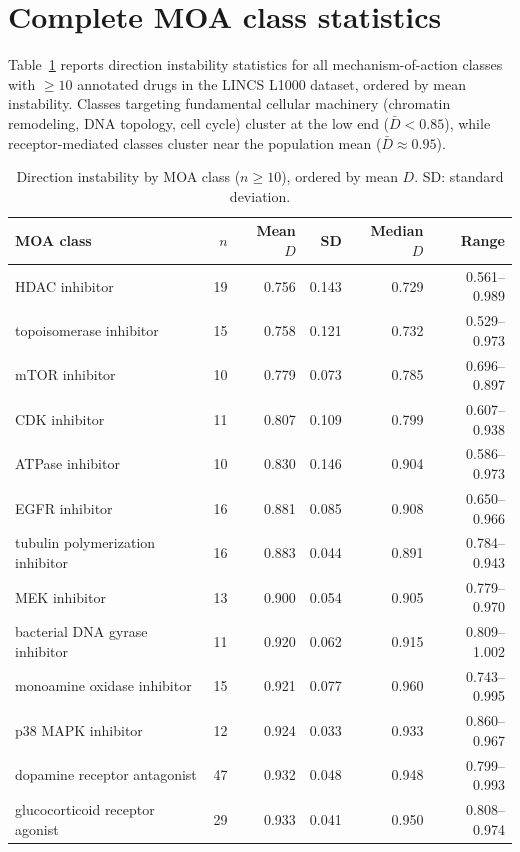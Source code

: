 \documentclass[11pt]{article}
\begin{document}



\appendix
\section{Complete MOA class statistics}
\label{app:moa}

Table~\ref{tab:moa_full} reports direction instability statistics for all
mechanism-of-action classes with $\geq 10$ annotated drugs in the LINCS L1000
dataset, ordered by mean instability. Classes targeting fundamental
cellular machinery (chromatin remodeling, DNA topology, cell cycle) cluster
at the low end ($\bar{D} < 0.85$), while receptor-mediated classes cluster
near the population mean ($\bar{D} \approx 0.95$).

\begin{table}[h]
\centering
\caption{Direction instability by MOA class ($n \geq 10$), ordered by
mean $D$. SD: standard deviation.}
\label{tab:moa_full}
\small
\begin{tabular}{lrrrrr}
\toprule
MOA class & $n$ & Mean $D$ & SD & Median $D$ & Range \\
\midrule
HDAC inhibitor & 19 & 0.756 & 0.143 & 0.729 & 0.561--0.989 \\
topoisomerase inhibitor & 15 & 0.758 & 0.121 & 0.732 & 0.529--0.973 \\
mTOR inhibitor & 10 & 0.779 & 0.073 & 0.785 & 0.696--0.897 \\
CDK inhibitor & 11 & 0.807 & 0.109 & 0.799 & 0.607--0.938 \\
ATPase inhibitor & 10 & 0.830 & 0.146 & 0.904 & 0.586--0.973 \\
EGFR inhibitor & 16 & 0.881 & 0.085 & 0.908 & 0.650--0.966 \\
tubulin polymerization inhibitor & 16 & 0.883 & 0.044 & 0.891 & 0.784--0.943 \\
MEK inhibitor & 13 & 0.900 & 0.054 & 0.905 & 0.779--0.970 \\
bacterial DNA gyrase inhibitor & 11 & 0.920 & 0.062 & 0.915 & 0.809--1.002 \\
monoamine oxidase inhibitor & 15 & 0.921 & 0.077 & 0.960 & 0.743--0.995 \\
p38 MAPK inhibitor & 12 & 0.924 & 0.033 & 0.933 & 0.860--0.967 \\
dopamine receptor antagonist & 47 & 0.932 & 0.048 & 0.948 & 0.799--0.993 \\
glucocorticoid receptor agonist & 29 & 0.933 & 0.041 & 0.950 & 0.808--0.974 \\

\end{tabular}
\end{table}
\end{document}
